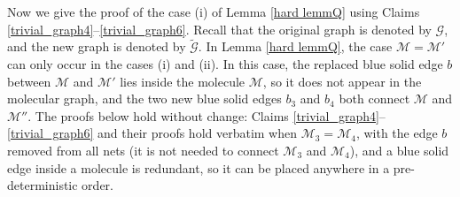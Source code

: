 \documentclass{article}
\newcommand{\1}{\mathds{1}}
\numberwithin{equation}{section}
\renewcommand{\cal}{\mathcal}
\newcommand{\wt}{\widetilde}
\theoremstyle{plain} %
\theoremstyle{remark}
\begin{document}
Now we give the proof of the case (i) of Lemma \ref{hard lemmQ} using Claims \ref{trivial_graph4}--\ref{trivial_graph6}. Recall that the original graph is denoted by $\cal G$, and the new graph is denoted by $\wt{\cal G}$. In Lemma \ref{hard lemmQ}, the case $\cal M=\cal M'$ can only occur in the cases (i) and (ii). In this case, the replaced blue solid edge $b$ between $\cal M$ and $\cal M'$ lies inside the molecule $\cal M$, so it does not appear in the molecular graph, and the two new blue solid edges $b_3$ and $b_4$ both connect $\cal M$ and $\cal M''$. The proofs below hold without change: Claims \ref{trivial_graph4}--\ref{trivial_graph6} and their proofs hold verbatim when $\cal M_3=\cal M_4$, with the edge $b$ removed from all nets (it is not needed to connect $\cal M_3$ and $\cal M_4$), and a blue solid edge inside a molecule is redundant, so it can be placed anywhere in a pre-deterministic order.
\end{document}
